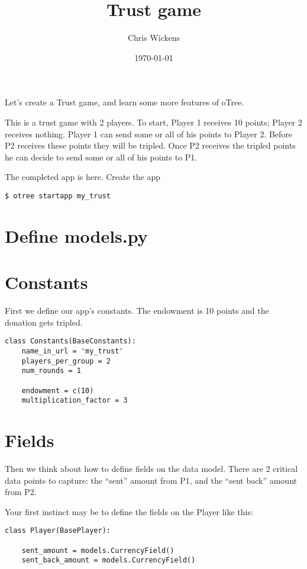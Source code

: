 \documentclass[11pt]{article}
\author{Chris Wickens}
\date{\today}
\title{Trust game}
\begin{document}
\maketitle
\tableofcontents

\newpage
Let’s create a Trust game, and learn some more features of oTree.

This is a trust game with 2 players. To start, Player 1 receives 10 points; Player 2 receives nothing. Player 1 can send some or all of his points to Player 2. Before P2 receives these points they will be tripled. Once P2 receives the tripled points he can decide to send some or all of his points to P1.

The completed app is here.
Create the app

\begin{verbatim}
$ otree startapp my_trust
\end{verbatim}

\section{Define models.py}
\label{sec:orgheadline1}

\section{Constants}
\label{sec:orgheadline2}
First we define our app’s constants. The endowment is 10 points and the donation gets tripled.

\begin{verbatim}
class Constants(BaseConstants):
    name_in_url = 'my_trust'
    players_per_group = 2
    num_rounds = 1

    endowment = c(10)
    multiplication_factor = 3
\end{verbatim}

\section{Fields}
\label{sec:orgheadline3}
Then we think about how to define fields on the data model. There are 2 critical data points to capture: the “sent” amount from P1, and the “sent back” amount from P2.

Your first instinct may be to define the fields on the Player like this:

\begin{verbatim}
class Player(BasePlayer):

    sent_amount = models.CurrencyField()
    sent_back_amount = models.CurrencyField()
\end{verbatim}
\end{document}
